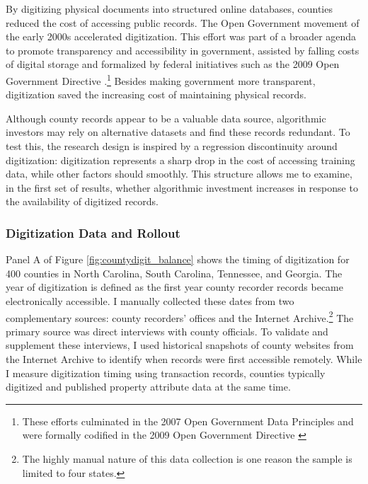 \documentclass[11pt]{article}
\begin{document}
By digitizing physical documents into structured online databases, counties reduced the cost of accessing public records.  The Open Government movement of the early 2000s accelerated digitization. This effort was part of a broader agenda to promote transparency and accessibility in government, assisted by falling costs of digital storage and formalized by federal initiatives such as the 2009 Open Government Directive \citep{gray2011beyondao, whitehouse2009}.\footnote{These efforts culminated in the 2007 Open Government Data Principles and were formally codified in the 2009 Open Government Directive \citep{schudson2020, gray2011beyondao, whitehouse2009, kavanaugh2010}} Besides making government more transparent, digitization saved the increasing cost of maintaining physical records. 

Although county records appear to be a valuable data source, algorithmic investors may rely on alternative datasets and find these records redundant. To test this, the research design is inspired by a regression discontinuity around digitization: digitization represents a sharp drop in the cost of accessing training data, while other factors should smoothly. This structure allows me to examine, in the first set of results, whether algorithmic investment increases in response to the availability of digitized records.



\subsubsection{Digitization Data and Rollout}\label{sec:data:digitrollout}
Panel A of Figure \ref{fig:countydigit_balance} shows the timing of digitization for 400 counties in North Carolina, South Carolina, Tennessee, and Georgia. The year of digitization is defined as the first year county recorder records became electronically accessible. I manually collected these dates from two complementary sources: county recorders’ offices and the Internet Archive.\footnote{The highly manual nature of this data collection is one reason the sample is limited to four states.} The primary source was direct interviews with county officials. To validate and supplement these interviews, I used historical snapshots of county websites from the Internet Archive to identify when records were first accessible remotely. While I measure digitization timing using transaction records, counties typically digitized and published property attribute data at the same time.
\end{document}
